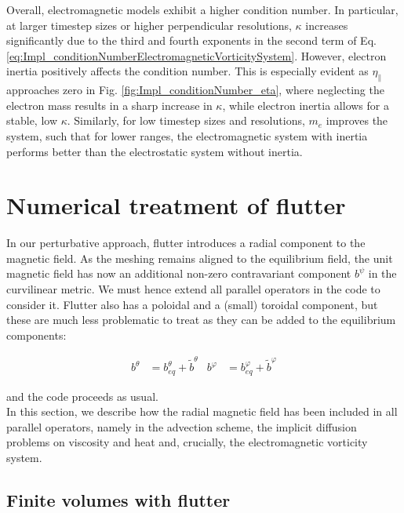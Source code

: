 Overall, electromagnetic models exhibit a higher condition number. In particular, at larger timestep sizes or higher perpendicular resolutions, $\kappa$ increases significantly due to the third and fourth exponents in the second term of Eq. \ref{eq:Impl_conditionNumberElectromagneticVorticitySystem}. However, electron inertia positively affects the condition number. This is especially evident as $\eta_\parallel$ approaches zero in Fig. \ref{fig:Impl_conditionNumber_eta}, where neglecting the electron mass results in a sharp increase in $\kappa$, while electron inertia allows for a stable, low $\kappa$. Similarly, for low timestep sizes and resolutions, $m_e$ improves the system, such that for lower ranges, the electromagnetic system with inertia performs better than the electrostatic system without inertia.





\section{Numerical treatment of flutter}

In our perturbative approach, flutter introduces a radial component to the magnetic field. As the meshing remains aligned to the equilibrium field, the unit magnetic field has now an additional non-zero contravariant component $b^\psi$ in the curvilinear metric. We must hence extend all parallel operators in the code to consider it. Flutter also has a poloidal and a (small) toroidal component, but these are much less problematic to treat as they can be added to the equilibrium components:

\begin{align}
	b^\theta &= b_{eq}^\theta + \tilde{b}^\theta & b^\varphi &= b_{eq}^\varphi + \tilde{b}^\varphi
\end{align}

and the code proceeds as usual. \\ 

In this section, we describe how the radial magnetic field has been included in all parallel operators, namely in the advection scheme, the implicit diffusion problems on viscosity and heat and, crucially, the electromagnetic vorticity system.


\subsection{Finite volumes with flutter}


